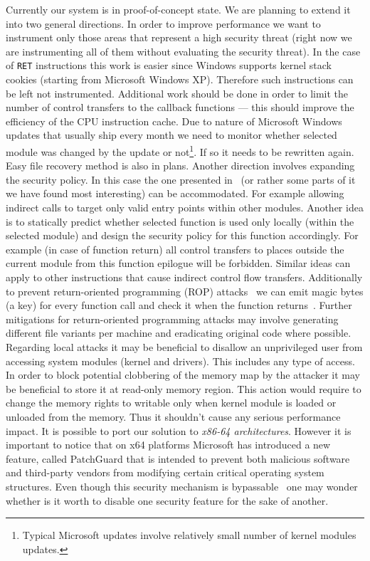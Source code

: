 \documentclass[10pt,twocolumn,a4paper]{article}
\begin{document}
Currently our system is in proof-of-concept state. We are planning to extend it into two general directions. In order to improve performance we want to instrument only those areas that represent a high security threat (right now we are instrumenting all of them without evaluating the security threat). In the case of {\tt{RET}} instructions this work is easier since Windows supports kernel stack cookies (starting from Microsoft Windows XP). Therefore such instructions can be left not instrumented. Additional work should be done in order to limit the number of control transfers to the callback functions --- this should improve the efficiency of the CPU instruction cache. Due to nature of Microsoft Windows updates that usually ship every month we need to monitor whether selected module was changed by the update or not\footnote{Typical Microsoft updates involve relatively small number of kernel modules updates.}. If so it needs to be rewritten again. Easy file recovery method is also in plans. 
{\newline\indent}Another direction involves expanding the security policy. In this case the one presented in~\cite{ProgramShep} (or rather some parts of it we have found most interesting) can be accommodated. For example allowing indirect calls to target only valid entry points within other modules. Another idea is to statically predict whether selected function is used only locally (within the selected module) and design the security policy for this function accordingly. For example (in case of function return) all control transfers to places outside the current module from this function epilogue will be forbidden. Similar ideas can apply to other instructions that cause indirect control flow transfers. Additionally to prevent return-oriented programming (ROP) attacks~\cite{RopPaper, RopPresent, RopDINO} we can emit magic bytes (a key) for every function call and check it when the function returns~\cite{PaxFuture, RopArticlePB}. Further mitigations for return-oriented programming attacks may involve generating different file variants per machine and eradicating original code where possible. Regarding local attacks it may be beneficial to disallow an unprivileged user from accessing system modules (kernel and drivers). This includes any type of access. 
{\newline\indent}In order to block potential clobbering of the memory map by the attacker it may be beneficial to store it at read-only memory region. This action would require to change the memory rights to writable only when kernel module is loaded or unloaded from the memory. Thus it shouldn't cause any serious performance impact. 
{\newline\indent}It is possible to port our solution to {\emph{x86-64 architectures}}. However it is important to notice that on x64 platforms Microsoft has introduced a new feature, called PatchGuard that is intended to prevent both malicious software and third-party vendors from modifying certain critical operating system structures. Even though this security mechanism is bypassable~\cite{PatchGuardBypass, PatchGuardBypass2} one may wonder whether is it worth to disable one security feature for the sake of another.
\end{document}
